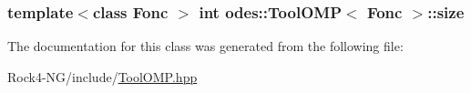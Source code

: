 \hypertarget{classodes_1_1ToolOMP_a9bdc5154c32b69a72ef1fc61f738da94}{
\subsubsection[{size}]{\setlength{\rightskip}{0pt plus 5cm}template$<$class Fonc $>$ int {\bf odes\-::\-Tool\-O\-M\-P}$<$ Fonc $>$\-::size\hspace{0.3cm}{\ttfamily [private]}}}\label{classodes_1_1ToolOMP_a9bdc5154c32b69a72ef1fc61f738da94}


The documentation for this class was generated from the following file\-:\begin{DoxyCompactItemize}
\item 
Rock4-\/\-N\-G/include/\hyperlink{ToolOMP_8hpp}{Tool\-O\-M\-P.\-hpp}\end{DoxyCompactItemize}

